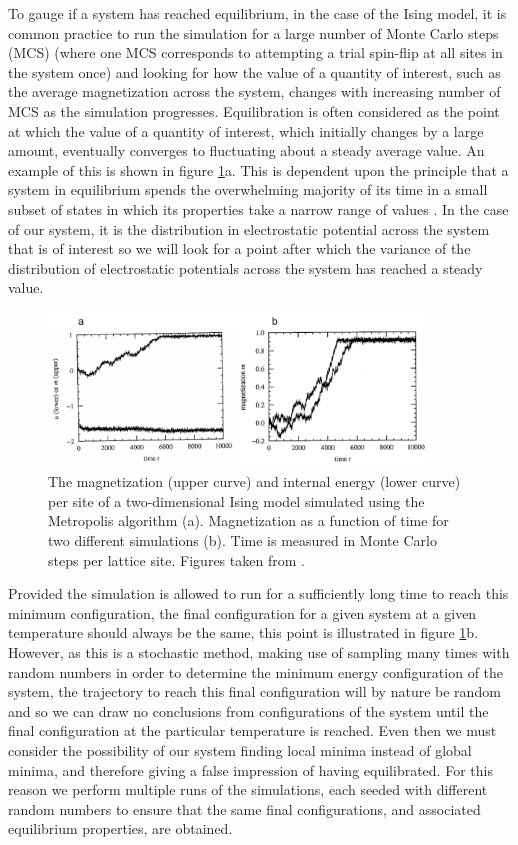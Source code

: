 To gauge if a system has reached equilibrium, in the case of the Ising model, it is common practice to run the simulation for a large number of Monte Carlo steps (MCS) (where one MCS corresponds to attempting a trial spin-flip at all sites in the system once) and looking for how the value of a quantity of interest, such as the average magnetization across the system, changes with increasing number of MCS as the simulation progresses. Equilibration is often considered as the point at which the value of a quantity of interest, which initially changes by a large amount, eventually converges to fluctuating about a steady average value. An example of this is shown in figure \ref{ising_equil}a. This is dependent upon the principle that a system in equilibrium spends the overwhelming majority of its time in a small subset of states in which its properties take a narrow range of values \cite{MC}. In the case of our system, it is the distribution in electrostatic potential across the system that is of interest so we will look for a point after which the variance of the distribution of electrostatic potentials across the system has reached a steady value.

\begin{figure}[h!]
  \centering
    \includegraphics[width=0.9\textwidth]{figures/ising_equil.png}
    \caption{The magnetization (upper curve) and internal energy (lower curve) per site of a two-dimensional Ising model simulated using the Metropolis algorithm (a). Magnetization as a function of time for two different simulations (b). Time is measured in Monte Carlo steps per lattice site. Figures taken from .}
  \label{ising_equil}
\end{figure}

Provided the simulation is allowed to run for a sufficiently long time to reach this minimum configuration, the final configuration for a given system at a given temperature should always be the same, this point is illustrated in figure \ref{ising_equil}b. However,  as this is a stochastic method, making use of sampling many times with random numbers in order to determine the minimum energy configuration of the system, the trajectory to reach this final configuration will by nature be random and so we can draw no conclusions from configurations of the system until the final configuration at the particular temperature is reached. Even then we must consider the possibility of our system finding local minima instead of global minima, and therefore giving a false impression of having equilibrated. For this reason we perform multiple runs of the simulations, each seeded with different random numbers to ensure that the same final configurations, and associated equilibrium properties, are obtained. 

